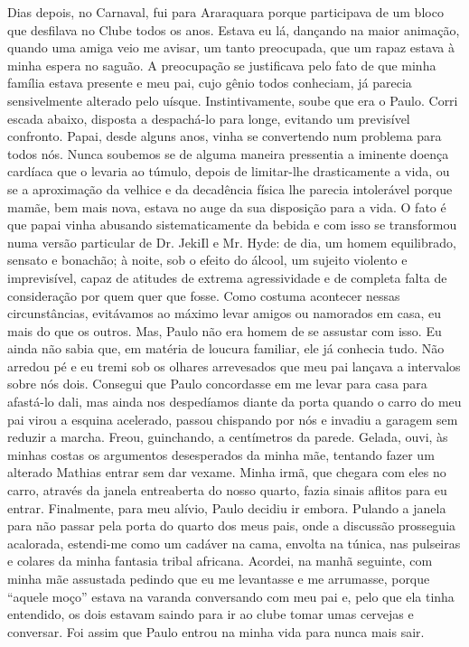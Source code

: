 Dias depois, no Carnaval, fui para Araraquara porque participava de um bloco que desfilava no Clube todos os anos.
Estava eu lá, dançando na maior animação, quando uma amiga veio me avisar, um tanto preocupada, que um rapaz estava à minha espera no saguão.
A preocupação se justificava pelo fato de que minha família estava presente e meu pai, cujo gênio todos conheciam, já parecia sensivelmente alterado pelo uísque.
 Instintivamente, soube que era o Paulo.
Corri escada abaixo, disposta a despachá-lo para longe, evitando um previsível confronto.
Papai, desde alguns anos, vinha se convertendo num problema para todos nós.
Nunca soubemos se de alguma maneira pressentia a iminente doença cardíaca que o levaria ao túmulo, depois de limitar-lhe drasticamente a vida, ou se a aproximação da velhice e da decadência física lhe parecia intolerável porque mamãe, bem mais nova, estava no auge da sua disposição para a vida.
O fato é que papai vinha abusando sistematicamente da bebida e com isso se transformou numa versão particular de Dr.
JekiIl e Mr. Hyde: de dia, um homem equilibrado, sensato e bonachão; à noite, sob o efeito do álcool, um sujeito violento e imprevisível, capaz de atitudes de extrema agressividade e de completa falta de consideração por quem quer que fosse.
Como costuma acontecer nessas circunstâncias, evitávamos ao máximo levar amigos ou namorados em casa, eu mais do que os outros.
Mas, Paulo não era homem de se assustar com isso.
Eu ainda não sabia que, em matéria de loucura familiar, ele já conhecia tudo.
Não arredou pé e eu tremi sob os olhares arrevesados que meu pai lançava a intervalos sobre nós dois.
Consegui que Paulo concordasse em me levar para casa para afastá-lo dali, mas ainda nos despedíamos diante da porta quando o carro do meu pai virou a esquina acelerado, passou chispando por nós e invadiu a garagem sem reduzir a marcha.
Freou, guinchando, a centímetros da parede.
Gelada, ouvi, às minhas costas os argumentos desesperados da minha mãe, tentando fazer um alterado Mathias entrar sem dar vexame.
 Minha irmã, que chegara com eles no carro, através da janela entreaberta do nosso quarto, fazia sinais aflitos para eu entrar.
Finalmente, para meu alívio, Paulo decidiu ir embora.
Pulando a janela para não passar pela porta do quarto dos meus pais, onde a discussão prosseguia acalorada, estendi-me como um cadáver na cama, envolta na túnica, nas pulseiras e colares da minha fantasia tribal africana.
Acordei, na manhã seguinte, com minha mãe assustada pedindo que eu me levantasse e me arrumasse, porque “aquele moço” estava na varanda conversando com meu pai e, pelo que ela tinha entendido, os dois estavam saindo para ir ao clube tomar umas cervejas e conversar.
 Foi assim que Paulo entrou na minha vida para nunca mais sair.

